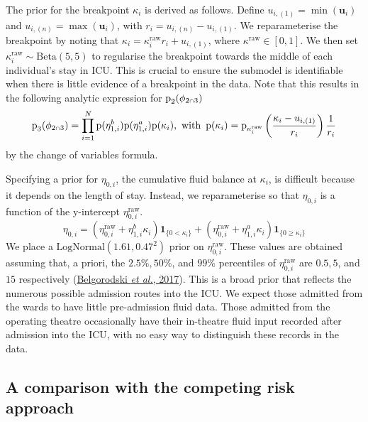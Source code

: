 \documentclass[
  10pt,
  a4paper,
]{article}
\let\Oldcap\cap
\renewcommand{\cap}{\mathrel{\mathsmaller{\Oldcap}}}
\newcommand{\pd}{\text{p}}
\begin{document}
The prior for the breakpoint \(\kappa_{i}\) is derived as follows.
Define \(u_{i, (1)} = \min(\boldsymbol{u}_{i})\) and
\(u_{i, (n)} = \max(\boldsymbol{u}_{i})\), with
\(r_{i} = u_{i, (n)} - u_{i, (1)}\). We reparameterise the breakpoint by
noting that \(\kappa_{i} = \kappa^{\text{raw}}_{i}r_{i} + u_{i, (1)}\),
where \(\kappa^{\text{raw}} \in [0, 1]\). We then set
\(\kappa^{\text{raw}}_{i} \sim \text{Beta}(5, 5)\) to regularise the
breakpoint towards the middle of each individual's stay in ICU. This is
crucial to ensure the submodel is identifiable when there is little
evidence of a breakpoint in the data. Note that this results in the
following analytic expression for \(\pd_{2}(\phi_{2 \cap 3})\)
\begin{equation}
  \pd_{3}(\phi_{2 \cap 3}) = \prod_{i = 1}^{N} \pd(\eta^{b}_{1, i}) \pd(\eta^{a}_{1, i}) \pd(\kappa_{i}), \,\, \text{with} \,\,\,
  \pd(\kappa_{i}) = \pd_{\kappa^{\text{raw}}_{i}}\left(\frac{\kappa_{i} - u_{i, (1)}}{r_{i}}\right) \frac{1}{r_{i}}
\end{equation} by the change of variables formula.

Specifying a prior for \(\eta_{0, i}\), the cumulative fluid balance at
\(\kappa_{i}\), is difficult because it depends on the length of stay.
Instead, we reparameterise so that \(\eta_{0, i}\) is a function of the
y-intercept \(\eta_{0, i}^{\text{raw}}\). \begin{equation}
  \eta_{0, i} =
    (\eta_{0, i}^{\text{raw}} + \eta^{b}_{1, i} \kappa_{i}) \boldsymbol{1}_{\{0 < \kappa_{i}\}} +
    (\eta_{0, i}^{\text{raw}} + \eta^{a}_{1, i} \kappa_{i}) \boldsymbol{1}_{\{0 \geq \kappa_{i}\}}
\end{equation} We place a \(\text{LogNormal}(1.61, 0.47^2)\) prior on
\(\eta_{0, i}^{\text{raw}}\). These values are obtained assuming that, a
priori, the \(2.5\%, 50\%\), and \(99\%\) percentiles of
\(\eta_{0, i}^{\text{raw}}\) are \(0.5, 5\), and \(15\) respectively
(\protect\hyperlink{ref-belgorodski_rriskdistributions_2017}{Belgorodski
\emph{et al.}, 2017}). This is a broad prior that reflects the numerous
possible admission routes into the ICU. We expect those admitted from
the wards to have little pre-admission fluid data. Those admitted from
the operating theatre occasionally have their in-theatre fluid input
recorded after admission into the ICU, with no easy way to distinguish
these records in the data.

\hypertarget{a-comparison-with-the-competing-risk-approach}{%
\subsection{A comparison with the competing risk
approach}\label{a-comparison-with-the-competing-risk-approach}}
\end{document}
